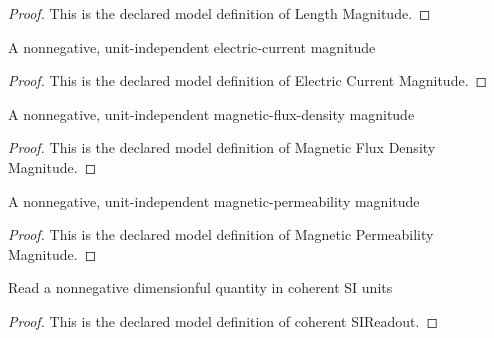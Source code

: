 \begin{proof}
  This is the declared model definition of Length Magnitude.
\end{proof}
\begin{definition}
  \label{def:physics:phyx-mini-0962:phyxminiproblems-problemphyxmini0962-electriccurrentmagnitude}
  A nonnegative, unit-independent electric-current magnitude
\end{definition}
\begin{proof}
  This is the declared model definition of Electric Current Magnitude.
\end{proof}
\begin{definition}
  \label{def:physics:phyx-mini-0962:phyxminiproblems-problemphyxmini0962-magneticfluxdensitymagnitude}
  A nonnegative, unit-independent magnetic-flux-density magnitude
\end{definition}
\begin{proof}
  This is the declared model definition of Magnetic Flux Density Magnitude.
\end{proof}
\begin{definition}
  \label{def:physics:phyx-mini-0962:phyxminiproblems-problemphyxmini0962-magneticpermeabilitymagnitude}
  A nonnegative, unit-independent magnetic-permeability magnitude
\end{definition}
\begin{proof}
  This is the declared model definition of Magnetic Permeability Magnitude.
\end{proof}
\begin{definition}
  \label{def:physics:phyx-mini-0962:phyxminiproblems-problemphyxmini0962-coherentsireadout}
  Read a nonnegative dimensionful quantity in coherent SI units
\end{definition}
\begin{proof}
  This is the declared model definition of coherent SIReadout.
\end{proof}
